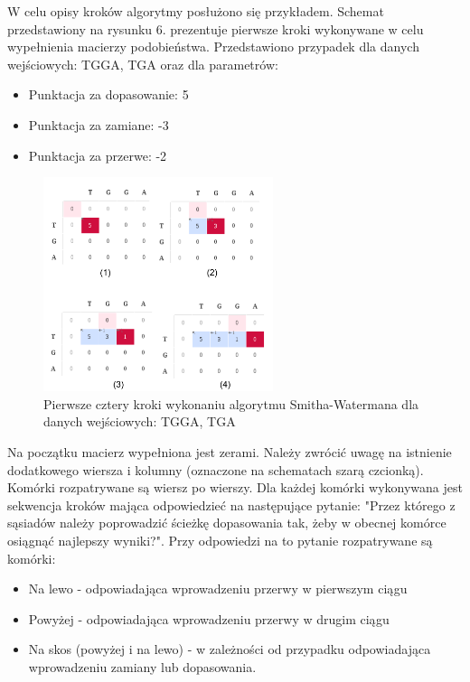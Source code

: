 \documentclass[a4paper,12pt]{article}
\newenvironment{lista}{
\begin{itemize}
  \setlength{\itemsep}{1pt}
  \setlength{\parskip}{0pt}
  \setlength{\parsep}{0pt}
}{\end{itemize}}
\begin{document}
W celu opisy kroków algorytmy posłużono się przykładem. Schemat przedstawiony na rysunku 6. prezentuje pierwsze kroki wykonywane w celu wypełnienia macierzy podobieństwa. Przedstawiono przypadek dla danych wejściowych: TGGA, TGA oraz dla parametrów:
\begin{lista}
\item Punktacja za dopasowanie: 5
\item Punktacja za zamiane: -3
\item Punktacja za przerwe: -2
\end{lista}

\begin{figure}[h]
  \vspace{5pt}
  \centering
  \begin{center}
  \includegraphics[width=0.6\textwidth]{images/SchematDzialaniaAlgorytmu.png}
  \end{center}
  \caption{Pierwsze cztery kroki wykonaniu algorytmu Smitha-Watermana dla danych wejściowych: TGGA, TGA}
 \end{figure}

Na początku macierz wypełniona jest zerami. Należy zwrócić uwagę na istnienie dodatkowego wiersza i kolumny (oznaczone na schematach szarą czcionką). Komórki rozpatrywane są wiersz po wierszy. Dla każdej komórki wykonywana jest sekwencja kroków mająca odpowiedzieć na następujące pytanie: "Przez którego z sąsiadów należy poprowadzić ścieżkę dopasowania tak, żeby w obecnej komórce osiągnąć najlepszy wyniki?". Przy odpowiedzi na to pytanie rozpatrywane są komórki:
\begin{lista}
\item Na lewo - odpowiadająca wprowadzeniu przerwy w pierwszym ciągu
\item Powyżej - odpowiadająca wprowadzeniu przerwy w drugim ciągu
\item Na skos (powyżej i na lewo) - w zależności od przypadku odpowiadająca wprowadzeniu zamiany lub dopasowania.
\end{lista}
\end{document}
